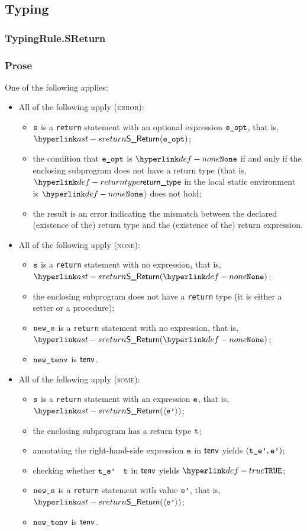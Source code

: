 \subsection{Typing}
\subsubsection{TypingRule.SReturn\label{sec:TypingRule.SReturn}}
\subsubsection{Prose}
One of the following applies:
\begin{itemize}
  \item All of the following apply (\textsc{error}):
  \begin{itemize}
    \item $\texttt{s}$ is a \texttt{return} statement with an optional expression $\texttt{e\_opt}$, that is, \\
          $\SReturn(\veopt)$;
    \item the condition that $\texttt{e\_opt}$ is $\None$ if and only if the enclosing subprogram does not have a return type
          (that is, $\returntype$ in the local static environment is $\None$) does not hold;
    \item the result is an error indicating the mismatch between the declared (existence of the) return type
          and the (existence of the) return expression.
  \end{itemize}

  \item All of the following apply (\textsc{none}):
  \begin{itemize}
    \item $\texttt{s}$ is a \texttt{return} statement with no expression, that is, $\SReturn(\None)$;
    \item the enclosing subprogram does not have a \texttt{return} type (it is either a setter
          or a procedure);
    \item $\texttt{new\_s}$ is a \texttt{return} statement with no expression, that is, $\SReturn(\None)$;
    \item $\texttt{new\_tenv}$ is $\textsf{tenv}$.
  \end{itemize}

  \item All of the following apply (\textsc{some}):
  \begin{itemize}
    \item $\texttt{s}$ is a \texttt{return} statement with an expression $\texttt{e}$, that is, $\SReturn(\langle \vep \rangle)$;
    \item the enclosing subprogram has a return type $\texttt{t}$;
    \item annotating the right-hand-side expression $\texttt{e}$ in $\textsf{tenv}$ yields $(\texttt{t\_e'},\texttt{e'})$\ProseOrTypeError;
    \item checking whether $\texttt{t\_e'}$ \typesatisfies\ $\texttt{t}$ in $\textsf{tenv}$ yields $\True$\ProseOrTypeError;
    \item $\texttt{new\_s}$ is a \texttt{return} statement with value $\texttt{e'}$, that is, $\SReturn(\langle \vep \rangle)$;
    \item $\texttt{new\_tenv}$ is $\textsf{tenv}$.
  \end{itemize}
\end{itemize}
